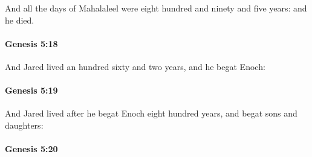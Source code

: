 			And all the days of Mahalaleel were eight hundred and ninety and five years: and he died.


		\paragraph{Genesis 5:18} %
			\label{GENESIS-5-18}

			And Jared lived an hundred sixty and two years, and he begat Enoch:


		\paragraph{Genesis 5:19} %
			\label{GENESIS-5-19}

			And Jared lived after he begat Enoch eight hundred years, and begat sons and daughters:


		\paragraph{Genesis 5:20} %
			\label{GENESIS-5-20}


